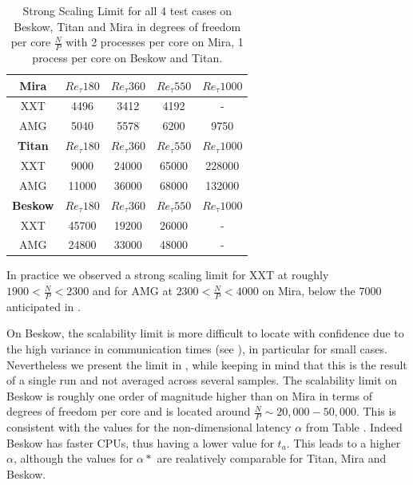 \documentclass{sig-alternate}
\begin{document}
\begin{table}  
  \caption{Strong Scaling Limit for all 4 test cases on Beskow, Titan and Mira
  in degrees of freedom per core $\frac{N}{P}$ with 2 processes per core on Mira, 1 process per core on Beskow and Titan.}%
  \centering
  \begin{tabular}{c||cccc}
    \hline
    \hline
    {\bf Mira}
    &$Re_{\tau} 180$&$Re_{\tau} 360$&$Re_{\tau} 550$&$Re_{\tau} 1000$\\
    \hline
    XXT&4496&3412&4192&-\\
    AMG&5040&5578&6200&9750\\
    \hline
    \hline
    {\bf Titan}
    &$Re_{\tau} 180$&$Re_{\tau} 360$&$Re_{\tau} 550$&$Re_{\tau} 1000$\\
    \hline
    XXT&9000&24000&65000&228000\\
    AMG&11000&36000&68000&132000\\
    \hline
    \hline
    {\bf Beskow}
    &$Re_{\tau} 180$&$Re_{\tau} 360$&$Re_{\tau} 550$&$Re_{\tau} 1000$\\
    \hline
    XXT&45700&19200&26000& - \\
    AMG&24800&33000&48000& - \\
    \hline
    \hline
  \end{tabular}
  \label{tab:stronglimit}
\end{table}

% 

In practice we observed a strong scaling limit for XXT at roughly $1900<
\frac{N}{P} < 2300$ and for AMG at $2300<\frac{N}{P}<4000$ on Mira, below the $7000$
anticipated in \cite{fischer:scaling}. 

On Beskow, the scalability limit is more difficult to locate with confidence due 
to the high variance in communication times (see ), 
in particular for small cases. Nevertheless we present the limit in 
, while keeping in mind that this is the result of a 
single run and not averaged across several samples. The scalability limit on 
Beskow is roughly one order of magnitude higher than on Mira in terms of degrees
of freedom per core and is located around $\frac{N}{P} \sim 20,000 - 50,000$. This 
is consistent with the values for the non-dimensional latency $\alpha$ 
from Table . Indeed Beskow has faster CPUs, thus having a
lower value for $t_a$. This leads to a higher $\alpha$, although the values for
$\alpha*$ are realatively comparable for Titan, Mira and Beskow. %
\end{document}
